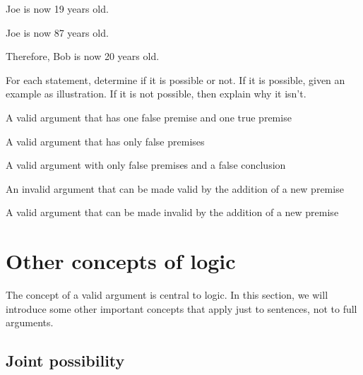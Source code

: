 \begin{earg}
\item Joe is now 19 years old.
\item Joe is now 87 years old.
\item Therefore, Bob is now 20 years old.
\end{earg}

\problempart
\label{pr.EnglishCombinations}
For each statement, determine if it is possible or not. If it is possible, given an example as illustration. If it is not possible, then explain why it isn't.
	\begin{earg}
		\item A valid argument that has one false premise and one true premise
		\item A valid argument that has only false premises
		\item A valid argument with only false premises and a false conclusion
		\item An invalid argument that can be made valid by the addition of a new premise
		\item A valid argument that can be made invalid by the addition of a new premise
	\end{earg}



\chapter{Other concepts of logic}\label{s:BasicNotions}

The concept of a valid argument is central to logic. In this section, we will introduce some other important concepts that apply just to sentences, not to full arguments. 

\section{Joint possibility}\label{s:joint-poss}

